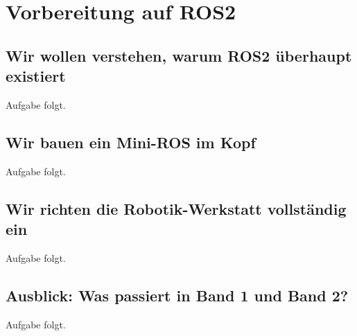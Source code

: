 \part{Vorbereitung auf ROS2}

\chapter{Wir wollen verstehen, warum ROS2 überhaupt existiert}


\kapitelstruktur

\begin{aufgabeBox}
Aufgabe folgt.
\end{aufgabeBox}


\chapter{Wir bauen ein Mini-ROS im Kopf}


\kapitelstruktur

\begin{aufgabeBox}
Aufgabe folgt.
\end{aufgabeBox}


\chapter{Wir richten die Robotik-Werkstatt vollständig ein}


\kapitelstruktur

\begin{aufgabeBox}
Aufgabe folgt.
\end{aufgabeBox}


\chapter{Ausblick: Was passiert in Band 1 und Band 2?}


\kapitelstruktur

\begin{aufgabeBox}
Aufgabe folgt.
\end{aufgabeBox}


